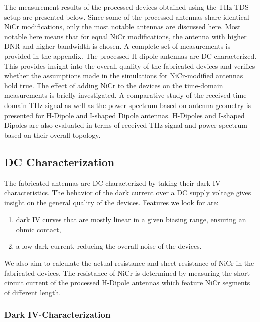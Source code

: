 The measurement results of the processed devices obtained using the THz-TDS setup are presented below. Since some of the processed antennas share identical NiCr modifications, only the most notable antennas are discussed here. Most notable here means that for equal NiCr modifications, the antenna with higher DNR and higher bandwidth is chosen. A complete set of measurements is provided in the appendix. The processed H-dipole antennas are DC-characterized. This provides insight into the overall quality of the fabricated devices and verifies whether the assumptions made in the simulations for NiCr-modified antennas hold true. The effect of adding NiCr to the devices on the time-domain measurements is briefly investigated. A comparative study of the received time-domain THz signal as well as the power spectrum based on antenna geometry is presented for H-Dipole and I-shaped Dipole antennas. H-Dipoles and I-shaped Dipoles are also evaluated in terms of received THz signal and power spectrum based on their overall topology. 


\subsection{DC Characterization}

The fabricated antennas are DC characterized by taking their dark IV characteristics. The behavior of the dark current over a DC supply voltage gives insight on the general quality of the devices. Features we look for are: 
\begin{enumerate}
    \item dark IV curves that are mostly linear in a given biasing range, ensuring an ohmic contact, 
    \item a low dark current, reducing the overall noise of the devices. 
\end{enumerate}

We also aim to calculate the actual resistance and sheet resistance of NiCr in the fabricated devices. The resistance of NiCr is determined by measuring the short circuit current of the processed H-Dipole antennas which feature NiCr segments of different length. 

\subsubsection{Dark IV-Characterization}

